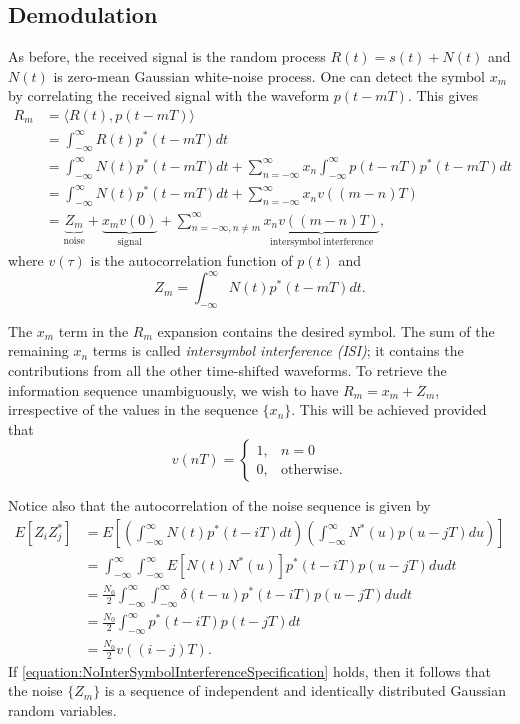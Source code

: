 \subsection{Demodulation}

As before, the received signal is the random process $R(t) = s(t) + N(t)$ and $N(t)$ is zero-mean Gaussian white-noise process.
One can detect the symbol $x_m$  by correlating the received signal with the waveform $p(t-mT)$.
This gives
\begin{align*}
R_m &= \langle R(t), p (t-mT) \rangle \\
&= \int_{-\infty}^{\infty} R(t) p^* (t-mT) dt \\
&=  \int_{-\infty}^{\infty} N(t) p^* (t-mT) dt +
\sum_{n = -\infty}^{\infty} x_n \int_{-\infty}^{\infty} p(t-nT) p^* (t-mT) dt \\
&=  \int_{-\infty}^{\infty} N(t) p^* (t-mT) dt +
\sum_{n = -\infty}^{\infty} x_n v \left( (m-n) T \right) \\
&=  \underbrace{Z_m}_{\mathrm{noise}} + \underbrace{x_m v (0)}_{\mathrm{signal}} + \sum_{n = -\infty, n\neq m}^{\infty} \underbrace{x_n v \left( (m-n) T \right)}_{\mathrm{intersymbol\;interference}},
\end{align*}
where $v (\tau)$ is the autocorrelation function of $p(t)$ and
\[ Z_m =  \int_{-\infty}^{\infty} N(t) p^* (t-mT) dt. \]

The $x_m$ term in the $R_m$ expansion contains the desired symbol.
The sum of the remaining $x_n$ terms is called \emph{intersymbol interference (ISI)}; it contains the contributions from all the other time-shifted waveforms.
To retrieve the information sequence unambiguously, we wish to have $R_m = x_m + Z_m$, irrespective of the values in the sequence $\{ x_n \}$.
This will be achieved provided that
\begin{equation} \label{equation:NoInterSymbolInterferenceSpecification}
v(nT) = \begin{cases} 1, & n = 0 \\
0, & \text{otherwise} . \end{cases}
\end{equation}

Notice also that the autocorrelation of the noise sequence is given by 
\begin{align*}
E [ Z_i Z_j^* ]
&= E \left[ \left( \int_{-\infty}^{\infty} N(t) p^* (t-iT) dt \right) \left( \int_{-\infty}^{\infty} N^* (u) p (u-jT) du \right) \right] \\
&= \int_{-\infty}^{\infty} \int_{-\infty}^{\infty} E[ N(t) N^* (u) ] p^* (t-iT) p (u-jT) du dt \\
&= \frac{N_0}{2} \int_{-\infty}^{\infty} \int_{-\infty}^{\infty} \delta(t-u) p^* (t-iT) p (u-jT) du dt \\
&= \frac{N_0}{2} \int_{-\infty}^{\infty} p^* (t-iT) p (t-jT) dt \\
&= \frac{N_0}{2} v ( (i-j)T ).
\end{align*}
If \eqref{equation:NoInterSymbolInterferenceSpecification} holds, then it follows that the noise $\{ Z_m \}$ is a sequence of independent and identically distributed Gaussian random variables.

